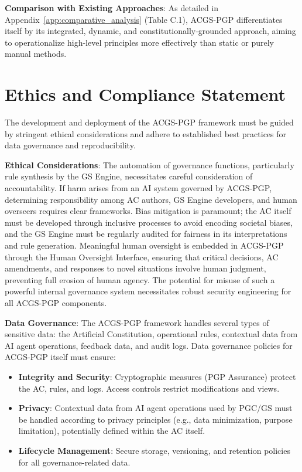 \documentclass[sigconf,review,anonymous=false]{acmart} %
\begin{document}
\textbf{Comparison with Existing Approaches}: As detailed in Appendix~\ref{app:comparative_analysis} (Table C.1), ACGS-PGP differentiates itself by its integrated, dynamic, and constitutionally-grounded approach, aiming to operationalize high-level principles more effectively than static or purely manual methods.

\section{Ethics and Compliance Statement}
\label{sec:ethics_compliance_statement}
The development and deployment of the ACGS-PGP framework must be guided by stringent ethical considerations and adhere to established best practices for data governance and reproducibility.

\textbf{Ethical Considerations}: The automation of governance functions, particularly rule synthesis by the GS Engine, necessitates careful consideration of accountability. If harm arises from an AI system governed by ACGS-PGP, determining responsibility among AC authors, GS Engine developers, and human overseers requires clear frameworks. Bias mitigation is paramount; the AC itself must be developed through inclusive processes to avoid encoding societal biases, and the GS Engine must be regularly audited for fairness in its interpretations and rule generation. Meaningful human oversight is embedded in ACGS-PGP through the Human Oversight Interface, ensuring that critical decisions, AC amendments, and responses to novel situations involve human judgment, preventing full erosion of human agency. The potential for misuse of such a powerful internal governance system necessitates robust security engineering for all ACGS-PGP components.

\textbf{Data Governance}: The ACGS-PGP framework handles several types of sensitive data: the Artificial Constitution, operational rules, contextual data from AI agent operations, feedback data, and audit logs. Data governance policies for ACGS-PGP itself must ensure:
\begin{itemize}
    \item \textbf{Integrity and Security}: Cryptographic measures (PGP Assurance) protect the AC, rules, and logs. Access controls restrict modifications and views.
    \item \textbf{Privacy}: Contextual data from AI agent operations used by PGC/GS must be handled according to privacy principles (e.g., data minimization, purpose limitation), potentially defined within the AC itself.
    \item \textbf{Lifecycle Management}: Secure storage, versioning, and retention policies for all governance-related data.
\end{itemize}
\end{document}

